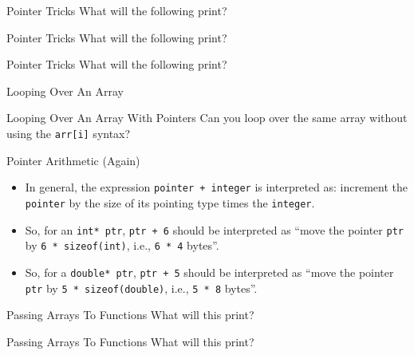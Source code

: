 \documentclass[aspectratio=169, 12pt]{beamer}
\begin{document}
	\begin{frame}{Pointer Tricks}
		What will the following print?
		
	\end{frame}

	\begin{frame}{Pointer Tricks}
		What will the following print?
		
	\end{frame}

	\begin{frame}{Pointer Tricks}
		What will the following print?
		
	\end{frame}
	
	\begin{frame}{Looping Over An Array}
		
	\end{frame}
	
	\begin{frame}{Looping Over An Array With Pointers}
		Can you loop over the same array without using the \texttt{arr[i]} syntax?\pause
		
	\end{frame}
	
	\begin{frame}{Pointer Arithmetic (Again)}
		\begin{itemize}
			\item In general, the expression \texttt{pointer + integer} is interpreted as: increment the \texttt{pointer} by the size of its pointing type times the \texttt{integer}.
			\item So, for an \texttt{int* ptr}, \texttt{ptr + 6} should be interpreted as ``move the pointer \texttt{ptr} by \texttt{6 * sizeof(int)}, i.e., \texttt{6 * 4} bytes''.
			\item So, for a \texttt{double* ptr}, \texttt{ptr + 5} should be interpreted as ``move the pointer \texttt{ptr} by \texttt{5 * sizeof(double)}, i.e., \texttt{5 * 8} bytes''.
		\end{itemize}
	\end{frame}

	\begin{frame}{Passing Arrays To Functions}
		What will this print?
		\scalebox{0.90}{%
		}
	\end{frame}

	\begin{frame}{Passing Arrays To Functions}
		What will this print?
		\scalebox{0.90}{%
		}
	\end{frame}
\end{document}
